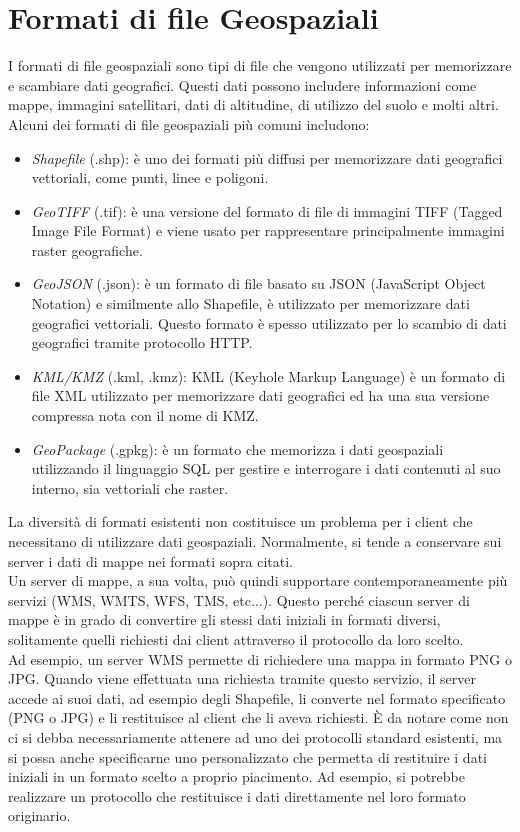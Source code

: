 \section{Formati di file Geospaziali}
I formati di file geospaziali sono tipi di file che vengono utilizzati per memorizzare e scambiare dati geografici. Questi dati possono includere informazioni come mappe, immagini satellitari, dati di altitudine, di utilizzo del suolo e molti altri. Alcuni dei formati di file geospaziali più comuni includono:
\begin{itemize}
      \item \textit {Shapefile} (.shp): è uno dei formati più diffusi per memorizzare dati geografici vettoriali, come punti, linee e poligoni.
      \item \textit {GeoTIFF} (.tif): è una versione del formato di file di immagini TIFF (Tagged Image File Format) e viene usato per rappresentare principalmente immagini raster geografiche.
      \item \textit {GeoJSON} (.json): è un formato di file basato su JSON (JavaScript Object Notation) e similmente allo Shapefile, è utilizzato per memorizzare dati geografici vettoriali. Questo formato è spesso utilizzato per lo scambio di dati geografici tramite protocollo HTTP.
      \item \textit {KML/KMZ} (.kml, .kmz): KML (Keyhole Markup Language) è un formato di file XML utilizzato per memorizzare dati geografici ed ha una sua versione compressa nota con il nome di KMZ.
      \item \textit {GeoPackage} (.gpkg): è un formato che memorizza i dati geospaziali utilizzando il linguaggio SQL per gestire e interrogare i dati contenuti al suo interno, sia vettoriali che raster.
\end{itemize}
La diversità di formati esistenti non costituisce un problema per i client che necessitano di utilizzare dati geospaziali. 
Normalmente, si tende a conservare sui server i dati di mappe nei formati sopra citati. 
\\Un server di mappe, a sua volta, può quindi supportare contemporaneamente più servizi (WMS, WMTS, WFS, TMS, etc...).  Questo perché ciascun server di mappe è in grado di convertire gli stessi dati iniziali in formati diversi, solitamente quelli richiesti dai client attraverso il protocollo da loro scelto.
\\Ad esempio, un server WMS permette di richiedere una mappa in formato PNG o JPG. Quando viene effettuata una richiesta tramite questo servizio, il server accede ai suoi dati, ad esempio degli Shapefile, li converte nel formato specificato (PNG o JPG) e li restituisce al client che li aveva richiesti.
È da notare come non ci si debba necessariamente attenere ad uno dei protocolli standard esistenti, ma si possa anche specificarne uno personalizzato che permetta di restituire i dati iniziali in un formato scelto a proprio piacimento. Ad esempio, si potrebbe realizzare un protocollo che restituisce i dati direttamente nel loro formato originario.

